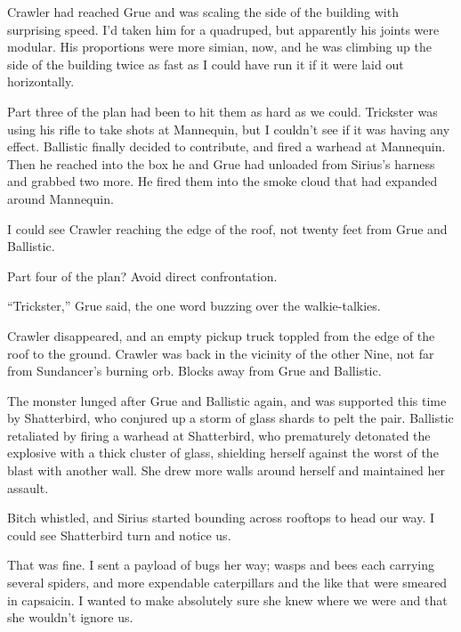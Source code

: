 Crawler had reached Grue and was scaling the side of the building with surprising speed.  I'd taken him for a quadruped, but apparently his joints were modular.  His proportions were more simian, now, and he was climbing up the side of the building twice as fast as I could have run it if it were laid out horizontally.



Part three of the plan had been to hit them as hard as we could.  Trickster was using his rifle to take shots at Mannequin, but I couldn't see if it was having any effect.  Ballistic finally decided to contribute, and fired a warhead at Mannequin.  Then he reached into the box he and Grue had unloaded from Sirius's harness and grabbed two more.  He fired them into the smoke cloud that had expanded around Mannequin.



I could see Crawler reaching the edge of the roof, not twenty feet from Grue and Ballistic.



Part four of the plan?  Avoid direct confrontation.



``Trickster,'' Grue said, the one word buzzing over the walkie-talkies.



Crawler disappeared, and an empty pickup truck toppled from the edge of the roof to the ground.  Crawler was back in the vicinity of the other Nine, not far from Sundancer's burning orb.  Blocks away from Grue and Ballistic.



The monster lunged after Grue and Ballistic again, and was supported this time by Shatterbird, who conjured up a storm of glass shards to pelt the pair.  Ballistic retaliated by firing a warhead at Shatterbird, who prematurely detonated the explosive with a thick cluster of glass, shielding herself against the worst of the blast with another wall.  She drew more walls around herself and maintained her assault.



Bitch whistled, and Sirius started bounding across rooftops to head our way.  I could see Shatterbird turn and notice us.



That was fine.  I sent a payload of bugs her way; wasps and bees each carrying several spiders, and more expendable caterpillars and the like that were smeared in capsaicin.  I wanted to make absolutely sure she knew where we were and that she wouldn't ignore us.



